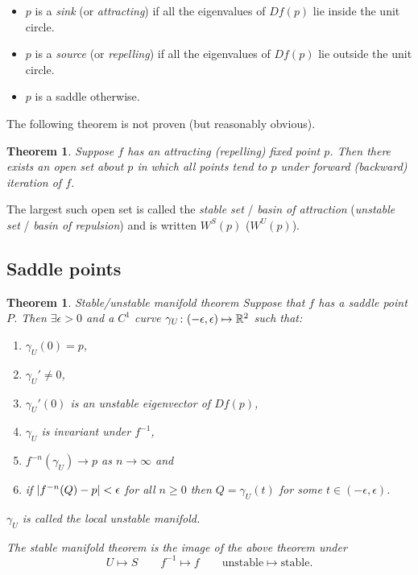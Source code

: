 \documentclass{notes}
\theoremstyle{plain}
\newtheorem{theorem}[proposition]{Theorem}
\begin{document}
\begin{itemize}
\item $p$ is a \emph{sink} (or \emph{attracting}) if all the
  eigenvalues of $Df(p)$ lie inside the unit circle.
\item $p$ is a \emph{source} (or \emph{repelling}) if all the
  eigenvalues of $Df(p)$ lie outside the unit circle.
\item $p$ is a saddle otherwise.
\end{itemize}

The following theorem is not proven (but reasonably obvious).

\begin{theorem}
Suppose $f$ has an attracting (repelling) fixed point $p$.  Then there
exists an open set about $p$ in which all points tend to $p$ under
forward (backward) iteration of $f$.
\end{theorem}

The largest such open set is called the \emph{stable set} / \emph{basin of
attraction} (\emph{unstable set} / \emph{basin of repulsion}) 
and is written $W^S(p)$ ($W^U(p)$).

\subsection{Saddle points}

\begin{theorem}{Stable/unstable manifold theorem}
Suppose that $f$ has a saddle point $P$.  Then $\exists \epsilon > 0$
and a $C^1$ curve $\gamma_U \colon (-\epsilon,\epsilon) \mapsto \mathbb{R}^2$
such that:

\begin{enumerate}
\item $\gamma_U(0) = p$,
\item $\gamma_U' \neq 0$,
\item $\gamma_U'(0)$ is an unstable eigenvector of $Df(p)$,
\item $\gamma_U$ is invariant under $f^{-1}$,
\item $f^{-n}(\gamma_U) \to p$ as $n \to \infty$ and
\item if $\left|f^{-n}(Q) - p\right| < \epsilon$ for all $n \ge 0$ then
$Q = \gamma_U(t)$ for some $t \in (-\epsilon,\epsilon)$.
\end{enumerate}

$\gamma_U$ is called the local unstable manifold.

The \emph{stable} manifold theorem is the image of the above
theorem under
\[
U \mapsto S \qquad f^{-1} \mapsto f \qquad \text{unstable} \mapsto
\text{stable}.
\]
\end{theorem}
\end{document}
